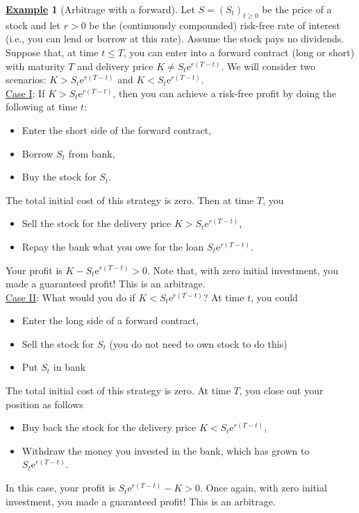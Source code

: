 \documentclass[12pt]{book}
\numberwithin{equation}{chapter}
\theoremstyle{plain}
\numberwithin{theorem}{section}
\theoremstyle{definition}
\newtheorem{example}[theorem]{\underline{Example}}
\numberwithin{exercise}{chapter}
\newcommand{\<}{\langle}
\renewcommand{\>}{\rangle}
\renewcommand{\(}{\left(}
\renewcommand{\)}{\right)}
\renewcommand{\[}{\left[}
\renewcommand{\]}{\right]}
\newcommand\ee{\mathrm{e}}
\theoremstyle{definition}
\numberwithin{question}{section}
\begin{document}
\begin{example}[Arbitrage with a forward] \label{ex:forward_arb}
Let $S = (S_t)_{t \geq 0}$ be the price of a stock and let $r>0$ be the (continuously compounded) risk-free rate of interest (i.e., you can lend or borrow at this rate).  Assume the stock pays no dividends.  Suppose that, at time $t \leq T$, you can enter into a forward contract (long or short) with maturity $T$ and delivery price $K \neq S_t \ee^{r(T-t)}$.  We will consider two scenarios: $K > S_t \ee^{r(T-t)}$ and $K < S_t \ee^{r(T-t)}$.
\\[0.5em]
\underline{Case I}:  If $K > S_t \ee^{r(T-t)}$, then you can achieve a risk-free profit by doing the following at time $t$:
\begin{itemize}
\item Enter the short side of the forward contract,
\item Borrow $S_t$ from bank,
\item Buy the stock for $S_t$.
\end{itemize}
The total initial cost of this strategy is zero.
Then at time $T$, you
\begin{itemize}
\item Sell the stock for the delivery price $K > S_t \ee^{r(T-t)}$,
\item Repay the bank what you owe for the loan $S_t \ee^{r(T-t)}$.
\end{itemize}
Your profit is $K - S_t \ee^{r(T-t)} > 0$. Note that, with zero initial investment, you made a guaranteed profit!  This is an arbitrage.
\\[0.5em]
\underline{Case II}:  What would you do if $K < S_t \ee^{r(T-t)}$? At time $t$, you could
\begin{itemize}
\item Enter the long side of a forward contract,
\item Sell the stock for $S_t$ (you do not need to own stock to do this)
\item Put $S_t$ in bank
\end{itemize}
The total initial cost of this strategy is zero.
At time $T$, you close out your position as follows
\begin{itemize}
\item Buy back the stock for the delivery price $K < S_t \ee^{r(T-t)}$,
\item Withdraw the money you invested in the bank, which has grown to $S_t \ee^{r(T-t)}$.
\end{itemize}
In this case, your profit is $S_t \ee^{r(T-t)} - K > 0$. Once again, with zero initial investment, you made a guaranteed profit!  This is an arbitrage.
\end{example}
\end{document}
